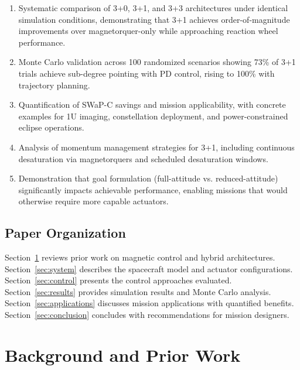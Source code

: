 \documentclass[9pt]{extarticle}
\begin{document}
\begin{enumerate}
    \item Systematic comparison of 3+0, 3+1, and 3+3 architectures under identical simulation conditions, demonstrating that 3+1 achieves order-of-magnitude improvements over magnetorquer-only while approaching reaction wheel performance.

    \item Monte Carlo validation across 100 randomized scenarios showing 73\% of 3+1 trials achieve sub-degree pointing with PD control, rising to 100\% with trajectory planning.

    \item Quantification of SWaP-C savings and mission applicability, with concrete examples for 1U imaging, constellation deployment, and power-constrained eclipse operations.

    \item Analysis of momentum management strategies for 3+1, including continuous desaturation via magnetorquers and scheduled desaturation windows.

    \item Demonstration that goal formulation (full-attitude vs. reduced-attitude) significantly impacts achievable performance, enabling missions that would otherwise require more capable actuators.
\end{enumerate}

\subsection{Paper Organization}

Section~\ref{sec:background} reviews prior work on magnetic control and hybrid architectures. Section~\ref{sec:system} describes the spacecraft model and actuator configurations. Section~\ref{sec:control} presents the control approaches evaluated. Section~\ref{sec:results} provides simulation results and Monte Carlo analysis. Section~\ref{sec:applications} discusses mission applications with quantified benefits. Section~\ref{sec:conclusion} concludes with recommendations for mission designers.


\section{Background and Prior Work}\label{sec:background}
\end{document}
